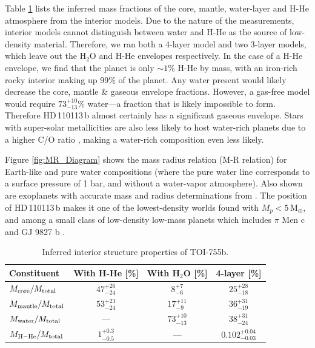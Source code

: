 \documentclass[fleqn,usenatbib]{mnras}
\newcommand{\mearth}{M$_{\oplus}$}
\newcommand{\Tplanet}{HD\,110113\,b}
\begin{document}
Table \ref{tab:interior} lists the inferred mass fractions of the core, mantle, water-layer and H-He atmosphere from the interior models.
Due to the nature of the measurements, interior models cannot distinguish between water and H-He as the source of low-density material. 
Therefore, we ran both a 4-layer model and two 3-layer models, which leave out the H$_{2}$O and H-He envelopes respectively.
In the case of a H-He envelope, we find that the planet is only $\sim1$\% H-He by mass, with an iron-rich rocky interior making up 99\% of the planet.
Any water present would likely decrease the core, mantle \& gaseous envelope fractions.
However, a gas-free model would require $73 ^{+10} _{-13}$\% water---a fraction that is likely impossible to form. Therefore \Tplanet{} almost certainly has a significant gaseous envelope.
Stars with super-solar metallicities are also less likely to host water-rich planets due to a higher C/O ratio \citep{bitsch2020influence}, making a water-rich composition even less likely.

Figure \ref{fig:MR_Diagram} shows the mass radius relation (M-R relation) for Earth-like and pure water compositions (where the pure water line corresponds to a surface pressure of 1 bar, and without a water-vapor atmosphere).
Also shown are exoplanets with accurate mass and radius determinations from \citet{otegi2020revisited}.
The position of \Tplanet{} makes it one of the lowest-density worlds found with $M_p<5$\,\mearth{}, and among a small class of low-density low-mass planets which includes $\pi{}$ Men c \citep{huang2018tess} and GJ 9827 b \citep{niraula2017three}.

\begin{table}
\caption{Inferred interior structure properties of TOI-755b.}
\label{tab:interior}
\begin{tabular}{lccc}
\hline
\hline
Constituent & With H-He [\%] & With H$_{2}$O [\%] & 4-layer [\%] \\
\hline
\hline
$M_{\rm core}/M_{\rm total}$ & $47 ^{+26} _{-24} $ & $8 ^{+7} _{-6}$ & $25 ^{+28} _{-18}$\\
$M_{\rm mantle}/M_{\rm total}$ & $ 53 ^{+23} _{-24} $ & $17 ^{+11} _{-9}$ & $36 ^{+31} _{-19}$\\
$M_{\rm water}/M_{\rm total}$ & --- & $73 ^{+10} _{-13}$ & $38 ^{+31} _{-24}$\\
$M_{\rm H-He}/M_{\rm total}$ & $1 ^{+0.3} _{-0.5}$ & --- & $0.102  ^{+0.04} _{-0.03}$\\
\hline
\hline
\end{tabular}
\end{table}
\end{document}

